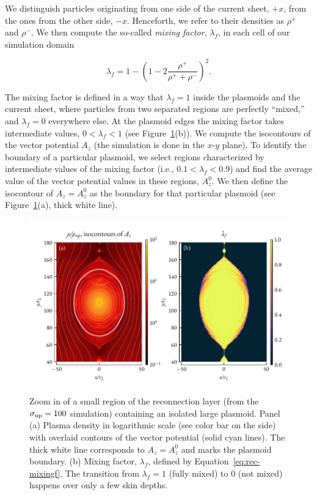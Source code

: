 We distinguish particles originating from one side of the current sheet, $+x$, from the ones from the other side, $-x$. Henceforth, we refer to their densities as $\rho^+$ and $\rho^-$. We then compute the so-called {\it mixing factor}, $\lambda_f$, in each cell of our simulation domain

\begin{equation}
    \lambda_f = 1 - \left(1 - 2\frac{\rho^+}{\rho^+ + \rho^-}\right)^2.
    \label{eq:rec-mixingf}
\end{equation}

The mixing factor is defined in a way that $\lambda_f = 1$ inside the plasmoids and the current sheet, where particles from two separated regions are perfectly ``mixed,'' and $\lambda_f = 0$ everywhere else. At the plasmoid edges the mixing factor takes intermediate values, $0 < \lambda_f < 1$ (see Figure~\ref{fig:rec-plasmbound}(b)). We compute the isocontours of the vector potential $A_z$ (the simulation is done in the $x$-$y$ plane). To identify the boundary of a particular plasmoid, we select regions characterized by intermediate values of the mixing factor (i.e.,  $0.1 < \lambda_f < 0.9$) and find the average value of the vector potential values in these regions, $A_z^0$. We then define the isocontour of $A_z=A_z^0$ as the boundary for that particular plasmoid (see Figure~\ref{fig:rec-plasmbound}(a), thick white line).

\begin{figure}[!ht]
    \centering
    \includegraphics[width=\textwidth]{figures/ch2-reconnection/figb1.pdf}
    \caption{Zoom in of a small region of the reconnection layer (from the $\sigma_{\rm up}=100$ simulation) containing an isolated large plasmoid. Panel (a) Plasma density in logarithmic scale (see color bar on the side)  with overlaid contours of the vector potential (solid cyan lines). The thick white line corresponds to $A_z=A_z^0$ and marks the plasmoid boundary. (b) Mixing factor, $\lambda_f$, defined by Equation~\ref{eq:rec-mixingf}. The transition from $\lambda_f=1$ (fully mixed) to 0 (not mixed) happens over only a few skin depths.}    
    \label{fig:rec-plasmbound}
\end{figure}


